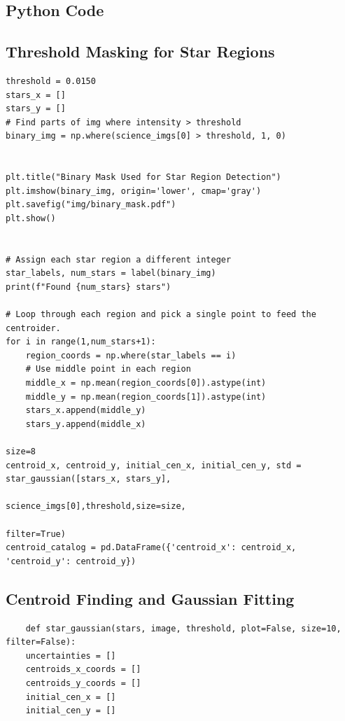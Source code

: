 \documentclass{article}
\begin{document}
\begin{appendices}
    
\section{Python Code}
\subsection{Threshold Masking for Star Regions}
\begin{small}
\begin{verbatim}
threshold = 0.0150
stars_x = []
stars_y = []
# Find parts of img where intensity > threshold
binary_img = np.where(science_imgs[0] > threshold, 1, 0)


plt.title("Binary Mask Used for Star Region Detection")
plt.imshow(binary_img, origin='lower', cmap='gray')
plt.savefig("img/binary_mask.pdf")
plt.show()


# Assign each star region a different integer
star_labels, num_stars = label(binary_img)
print(f"Found {num_stars} stars")

# Loop through each region and pick a single point to feed the centroider.
for i in range(1,num_stars+1):
    region_coords = np.where(star_labels == i)
    # Use middle point in each region
    middle_x = np.mean(region_coords[0]).astype(int)
    middle_y = np.mean(region_coords[1]).astype(int) 
    stars_x.append(middle_y)
    stars_y.append(middle_x)
    
size=8
centroid_x, centroid_y, initial_cen_x, initial_cen_y, std = star_gaussian([stars_x, stars_y], 
                                                                          science_imgs[0],threshold,size=size,
                                                                          filter=True)
centroid_catalog = pd.DataFrame({'centroid_x': centroid_x, 'centroid_y': centroid_y})
\end{verbatim}
\end{small}

\subsection{Centroid Finding and Gaussian Fitting}

\begin{small}
\begin{verbatim}
    def star_gaussian(stars, image, threshold, plot=False, size=10, filter=False): 
    uncertainties = []   
    centroids_x_coords = []
    centroids_y_coords = []
    initial_cen_x = []
    initial_cen_y = []
    

\end{verbatim}
\end{small}
\end{appendices}
\end{document}

